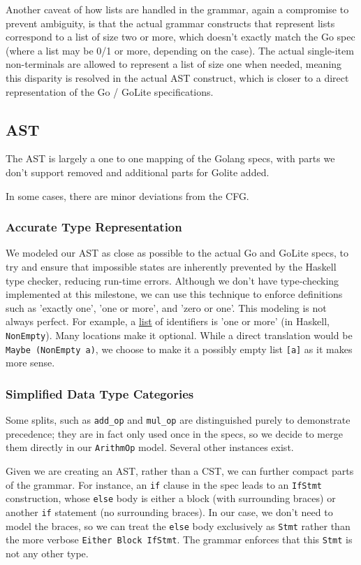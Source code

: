 \documentclass[11pt]{article}
\begin{document}
Another caveat of how lists are handled in the grammar, again a
compromise to prevent ambiguity, is that the actual grammar constructs
that represent lists correspond to a list of size two or more, which
doesn't exactly match the Go spec (where a list may be 0/1 or more,
depending on the case). The actual single-item non-terminals are allowed
to represent a list of size one when needed, meaning this disparity
is resolved in the actual AST construct, which is closer to a direct
representation of the Go / GoLite specifications.
\subsection{AST}
\label{sec:org7cb496b}
The AST is largely a one to one mapping of the Golang specs, with
parts we don't support removed and additional parts for Golite added.

In some cases, there are minor deviations from the CFG.
\subsubsection{Accurate Type Representation}
\label{sec:org5d45f0a}
We modeled our AST as close as possible to the actual Go and
GoLite specs, to try and ensure that impossible states are inherently
prevented by the Haskell type checker, reducing run-time errors.
Although we don't have type-checking implemented at this milestone,
we can use this technique to enforce definitions such as
'exactly one', 'one or more', and 'zero or one'. This modeling is
not always perfect. For example, a \href{https://golang.org/ref/spec\#IdentifierList}{list}
of identifiers is 'one or more' (in Haskell, \texttt{NonEmpty}). Many locations
make it optional. While a direct translation would be \texttt{Maybe (NonEmpty a)},
we choose to make it a possibly empty list \texttt{[a]} as it makes more sense.
\subsubsection{Simplified Data Type Categories}
\label{sec:org49190a9}
Some splits, such as \texttt{add\_op} and \texttt{mul\_op} are distinguished
purely to demonstrate precedence; they are in fact only used once
in the specs, so we decide to merge them directly in our \texttt{ArithmOp}
model. Several other instances exist.

Given we are creating an AST, rather than a CST, we can further
compact parts of the grammar. For instance, an \texttt{if} clause in the
spec leads to an \texttt{IfStmt} construction, whose \texttt{else} body is either
a block (with surrounding braces) or another \texttt{if} statement (no
surrounding braces). In our case, we don't need to model the braces,
so we can treat the \texttt{else} body exclusively as \texttt{Stmt} rather than
the more verbose \texttt{Either Block IfStmt}. The grammar enforces that
this \texttt{Stmt} is not any other type.
\end{document}
